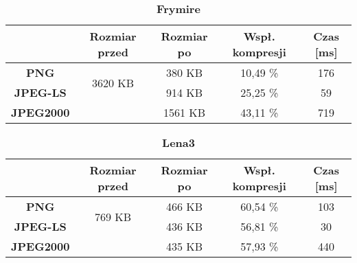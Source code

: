 \begin{table}[!h]
	\centering
	\caption{\textbf{Frymire}}
	\label{my-label}
	\begin{tabular}{|c|c|c|c|c|}                                             
		\hline
		& \textbf{Rozmiar przed} & \textbf{Rozmiar po} & \textbf{Wspł. kompresji} & \textbf{Czas {[}ms{]}} \\ \hline 
		\textbf{PNG}      &          \multicolumn{1}{c|}{\multirow{2}{*}{3620 KB}}             &         380 KB              &        10,49 \%                   &            176                 \\\cline{3-5}
		\textbf{JPEG-LS}  &                        &        914 KB             &         25,25 \%                 &           59               \\\cline{3-5}
		\textbf{JPEG2000} &                        &         1561 KB               &          43,11 \%                &       719               \\ \hline
	\end{tabular}
\end{table}

\begin{table}[!h]
	\centering
	\caption{\textbf{Lena3}}
	\label{my-label}
	\begin{tabular}{|c|c|c|c|c|}                                             
		\hline
		& \textbf{Rozmiar przed} & \textbf{Rozmiar po} & \textbf{Wspł. kompresji} & \textbf{Czas {[}ms{]}} \\ \hline 
		\textbf{PNG}      &          \multicolumn{1}{c|}{\multirow{2}{*}{769 KB}}             &      466 KB               &        60,54 \%                  &         103                    \\\cline{3-5}
		\textbf{JPEG-LS}  &                        &         436 KB            &      56,81 \%                   &         30                 \\\cline{3-5}
		\textbf{JPEG2000} &                        &     435 KB             &         57,93 \%                 &       440               \\ \hline
	\end{tabular}
\end{table}


